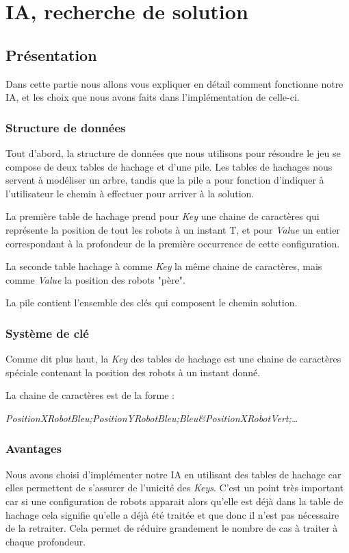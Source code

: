 \chapter{IA, recherche de solution}

\section{Présentation}
Dans cette partie nous allons vous expliquer en détail comment fonctionne notre IA, et les choix que nous avons faits dans l'implémentation de celle-ci.

\subsection{Structure de données}
Tout d'abord, la structure de données que nous utilisons pour résoudre le jeu se compose de deux tables de hachage et d'une pile. Les tables de hachages nous servent à modéliser un arbre, tandis que la pile a pour fonction d'indiquer à l'utilisateur le chemin à effectuer pour arriver à la solution.

La première table de hachage prend pour \emph{Key} une chaine de caractères qui représente la position de tout les robots à un instant T, et pour \emph{Value} un entier correspondant à la profondeur de la première occurrence de cette configuration. 

La seconde table hachage à comme \emph{Key} la même chaine de caractères, mais comme \emph{Value} la position des robots "père".

La pile contient l'ensemble des clés qui composent le chemin solution.

\subsection{Système de clé}
Comme dit plus haut, la \emph{Key} des tables de hachage est une chaine de caractères spéciale contenant la position des robots à un instant donné.

La chaine de caractères est de la forme : 

\emph{PositionXRobotBleu;PositionYRobotBleu;Bleu\&PositionXRobotVert;…}

\subsection{Avantages}
Nous avons choisi d'implémenter notre IA en utilisant des tables de hachage car elles permettent de s'assurer de l'unicité des \emph{Keys}. C'est un point très important car si une configuration de robots apparait alors qu'elle est déjà dans la table de hachage cela signifie qu'elle a déjà été traitée et que donc il n'est pas nécessaire de la retraiter. Cela permet de réduire grandement le nombre de cas à traiter à chaque profondeur.

